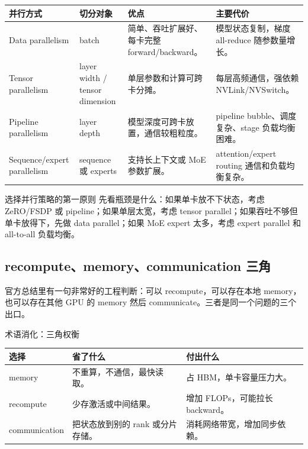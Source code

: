 \documentclass[a4paper]{article}
\begin{document}
\begin{longtable}{L{0.18\textwidth}L{0.16\textwidth}L{0.25\textwidth}L{0.25\textwidth}}
\toprule
并行方式 & 切分对象 & 优点 & 主要代价 \\
\midrule
\endhead
Data parallelism & batch & 简单、吞吐扩展好、每卡完整 forward/backward。 & 模型状态复制，梯度 all-reduce 随参数量增长。 \\
Tensor parallelism & layer width / tensor dimension & 单层参数和计算可跨卡分摊。 & 每层高频通信，强依赖 NVLink/NVSwitch。 \\
Pipeline parallelism & layer depth & 模型深度可跨卡放置，通信较粗粒度。 & pipeline bubble、调度复杂、stage 负载均衡困难。 \\
Sequence/expert parallelism & sequence 或 experts & 支持长上下文或 MoE 参数扩展。 & attention/expert routing 通信和负载均衡复杂。 \\
\bottomrule
\end{longtable}

\begin{importantbox}{选择并行策略的第一原则}
先看瓶颈是什么：如果单卡放不下状态，考虑 ZeRO/FSDP 或 pipeline；如果单层太宽，考虑 tensor parallel；如果吞吐不够但单卡放得下，先做 data parallel；如果 MoE expert 太多，考虑 expert parallel 和 all-to-all 负载均衡。
\end{importantbox}

\subsection{recompute、memory、communication 三角}

官方总结里有一句非常好的工程判断：可以 recompute，可以存在本地 memory，也可以存在其他 GPU 的 memory 然后 communicate。三者是同一个问题的三个出口。

\begin{knowledgebox}{术语消化：三角权衡}
\begin{tabular}{L{0.2\textwidth}L{0.35\textwidth}L{0.35\textwidth}}
\toprule
选择 & 省了什么 & 付出什么 \\
\midrule
memory & 不重算，不通信，最快读取。 & 占 HBM，单卡容量压力大。 \\
recompute & 少存激活或中间结果。 & 增加 FLOPs，可能拉长 backward。 \\
communication & 把状态放到别的 rank 或分片存储。 & 消耗网络带宽，增加同步依赖。 \\
\bottomrule
\end{tabular}
\end{knowledgebox}
\end{document}
